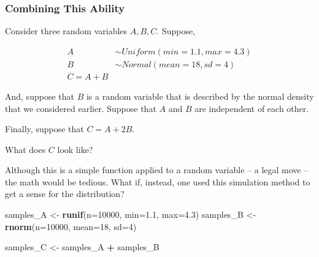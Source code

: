 \documentclass[
]{book}
\newenvironment{Shaded}{\begin{snugshade}}{\end{snugshade}}
\newcommand{\AttributeTok}[1]{\textcolor[rgb]{0.13,0.29,0.53}{#1}}
\newcommand{\DecValTok}[1]{\textcolor[rgb]{0.00,0.00,0.81}{#1}}
\newcommand{\FloatTok}[1]{\textcolor[rgb]{0.00,0.00,0.81}{#1}}
\newcommand{\FunctionTok}[1]{\textcolor[rgb]{0.13,0.29,0.53}{\textbf{#1}}}
\newcommand{\NormalTok}[1]{#1}
\newcommand{\OtherTok}[1]{\textcolor[rgb]{0.56,0.35,0.01}{#1}}
\newcommand{\SpecialCharTok}[1]{\textcolor[rgb]{0.81,0.36,0.00}{\textbf{#1}}}
\theoremstyle{definition}
\theoremstyle{definition}
\theoremstyle{definition}
\theoremstyle{definition}
\theoremstyle{remark}
\begin{document}
\subsubsection{Combining This Ability}\label{combining-this-ability}

Consider three random variables \(A, B, C\). Suppose,

\[ 
  \begin{aligned}
    A & \sim Uniform(min=1.1, max=4.3) \\ 
    B & \sim Normal(mean=18, sd=4)     \\ 
    C = A + B
  \end{aligned}
\]

And, suppose that \(B\) is a random variable that is described by the normal density that we considered earlier. Suppose that \(A\) and \(B\) are independent of each other.

Finally, suppose that \(C = A + 2B\).

What does \(C\) look like?

Although this is a simple function applied to a random variable -- a legal move -- the math would be tedious. What if, instead, one used this simulation method to get a sense for the distribution?

\begin{Shaded}
\begin{Highlighting}[]
\NormalTok{samples\_A }\OtherTok{\textless{}{-}} \FunctionTok{runif}\NormalTok{(}\AttributeTok{n=}\DecValTok{10000}\NormalTok{, }\AttributeTok{min=}\FloatTok{1.1}\NormalTok{, }\AttributeTok{max=}\FloatTok{4.3}\NormalTok{)}
\NormalTok{samples\_B }\OtherTok{\textless{}{-}} \FunctionTok{rnorm}\NormalTok{(}\AttributeTok{n=}\DecValTok{10000}\NormalTok{, }\AttributeTok{mean=}\DecValTok{18}\NormalTok{, }\AttributeTok{sd=}\DecValTok{4}\NormalTok{)}

\NormalTok{samples\_C }\OtherTok{\textless{}{-}}\NormalTok{ samples\_A }\SpecialCharTok{+}\NormalTok{ samples\_B}
\end{Highlighting}
\end{Shaded}
\end{document}
